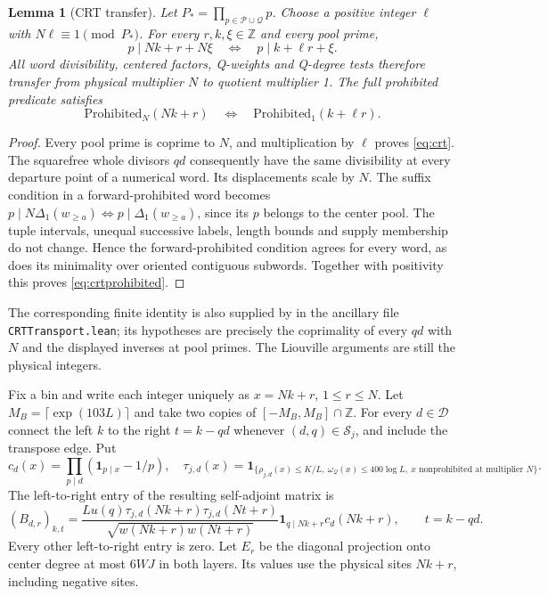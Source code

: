 \documentclass[11pt]{article}
\newtheorem{lemma}[theorem]{Lemma}
\theoremstyle{definition}
\newcommand{\Z}{\mathbb Z}
\newcommand{\ind}{\mathbf 1}
\begin{document}
\begin{lemma}[CRT transfer]\label{lem:crt}
Let $P_*=\prod_{p\in\mathcal P\cup\mathcal Q}p$.
Choose a positive integer $\ell$ with $N\ell\equiv1\pmod{P_*}$.
For every $r,k,\xi\in\Z$ and every pool prime,
\begin{equation}\label{eq:crt}
 p\mid Nk+r+N\xi\quad\Longleftrightarrow\quad
 p\mid k+\ell r+\xi.
\end{equation}
All word divisibility, centered factors, Q-weights and Q-degree tests
therefore transfer from physical multiplier $N$ to quotient multiplier
1. The full prohibited predicate satisfies
\begin{equation}\label{eq:crtprohibited}
 \mathrm{Prohibited}_N(Nk+r)
 \quad\Longleftrightarrow\quad
 \mathrm{Prohibited}_1(k+\ell r).
\end{equation}
\end{lemma}
\begin{proof}
Every pool prime is coprime to $N$, and multiplication by $\ell$
proves \eqref{eq:crt}. The squarefree whole divisors $qd$ consequently
have the same divisibility at every departure point of a numerical word.
Its displacements scale by $N$. The suffix condition in a
forward-prohibited word becomes
$p\mid N\Delta_1(w_{\ge a})\iff p\mid\Delta_1(w_{\ge a})$,
since its $p$ belongs to the center pool.
The tuple intervals, unequal successive labels, length bounds and supply
membership do not change. Hence the forward-prohibited condition agrees
for every word, as does its minimality over oriented contiguous subwords.
Together with positivity this proves \eqref{eq:crtprohibited}.
\end{proof}
The corresponding finite identity is also supplied by
 in the ancillary file
\texttt{CRTTransport.lean}; its hypotheses are precisely the
coprimality of every $qd$ with $N$ and the displayed inverses at pool
primes. The Liouville arguments are still the physical integers.

Fix a bin and write each integer uniquely as $x=Nk+r$, $1\le r\le N$.
Let $M_B=\lceil\exp(103L)\rceil$ and take two copies of
$[-M_B,M_B]\cap\Z$.
For every $d\in\mathcal D$ connect the left $k$ to the right
$t=k-qd$ whenever $(d,q)\in\mathcal S_j$, and include the transpose
edge. Put
\[
 c_d(x)=\prod_{p\mid d}(\ind_{p\mid x}-1/p),\quad
 \tau_{j,d}(x)=
 \ind_{\{\rho_{j,d}(x)\le K/L,\ \omega_{\mathcal Q}(x)\le400\log L,
                              \ x\text{ nonprohibited at multiplier }N\}}.
\]
The left-to-right entry of the resulting self-adjoint matrix is
\begin{equation}\label{eq:matrix}
 (B_{d,r})_{k,t}=
 \frac{L u(q)\tau_{j,d}(Nk+r)\tau_{j,d}(Nt+r)}
            {\sqrt{w(Nk+r)w(Nt+r)}}
       \ind_{q\mid Nk+r}c_d(Nk+r),\qquad t=k-qd.
\end{equation}
Every other left-to-right entry is zero. Let $E_r$ be the diagonal
projection onto center degree at most $6WJ$ in both layers.
Its values use the physical sites $Nk+r$, including negative sites.
\end{document}

